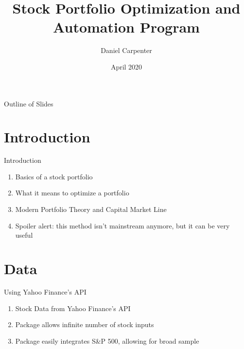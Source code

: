 \documentclass[handout,t]{beamer}
\title[Title]{Stock Portfolio Optimization and Automation Program}
\date{April 2020}
\author[Author]{Daniel Carpenter}
\institute[University]{University of Oklahoma}
\begin{document}
        \frame{\titlepage}
        \section[]{}
            \begin{frame}{Outline of Slides}
            	\tableofcontents
            \end{frame}
    
    \section{Introduction}
        \begin{frame}{Introduction}
        	\begin{doublespacing}
            	\begin{enumerate}
            	    \item Basics of a stock portfolio 
            	    \item What it means to optimize a portfolio 
            	    \item Modern Portfolio Theory and Capital Market Line 
            	    \item Spoiler alert: this method isn't mainstream anymore, but it can be very useful
            	\end{enumerate}
            \end{doublespacing}
        \end{frame}
    
    \section{Data}
        \begin{frame}{Using Yahoo Finance's API}
        	\begin{doublespacing}
            	\begin{enumerate}
            	    \item Stock Data from Yahoo Finance's API
            	    \item Package allows infinite number of stock inputs
            	    \item Package easily integrates S\&P 500, allowing for broad sample
            	\end{enumerate}
            \end{doublespacing}
        \end{frame}
        
\end{document}
